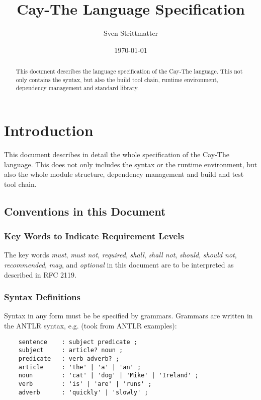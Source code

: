 \documentclass[a4paper,12pt]{report}
\title{Cay-The Language Specification}
\author{Sven Strittmatter}
\date{\today}
\begin{document}
\maketitle
\begin{abstract}
    This document describes the language specification of the Cay-The language. This not only contains the syntax, but also the build tool chain, runtime environment, dependency management and standard library.
\end{abstract}
\clearpage

\tableofcontents
\clearpage

\chapter{Introduction}

This document describes in detail the whole specification of the Cay-The language. This does not only includes the syntax or the runtime environment, but also the whole module structure, dependency management and build and test tool chain.

\section{Conventions in this Document}

\subsection{Key Words to Indicate Requirement Levels}

The key words \textit{must}, \textit{must not}, \textit{required}, \textit{shall}, \textit{shall not}, \textit{should}, \textit{should not}, \textit{recommended}, \textit{may}, and \textit{optional} in this document are to be interpreted as described in RFC 2119\cite{rfc2119}.

\subsection{Syntax Definitions}

Syntax in any form must be be specified by grammars. Grammars are written in the ANTLR syntax\cite{antlr-docu}, e.g. (took from ANTLR examples\cite{antlr-grammars}):

\begin{verbatim}
    sentence    : subject predicate ;
    subject     : article? noun ;
    predicate   : verb adverb? ;
    article     : 'the' | 'a' | 'an' ;
    noun        : 'cat' | 'dog' | 'Mike' | 'Ireland' ;
    verb        : 'is' | 'are' | 'runs' ;
    adverb      : 'quickly' | 'slowly' ;
\end{verbatim}
\end{document}
